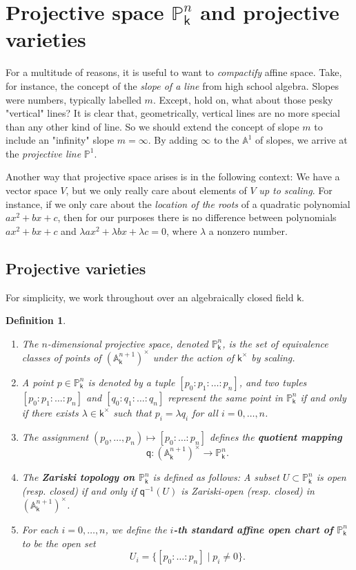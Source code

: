 \documentclass[11pt]{article}
\newcommand{\A}{\mathbb{A}}
\renewcommand{\P}{\mathbb{P}}
\newcommand{\q}{\mathsf{q}}
\renewcommand{\k}{\mathsf{k}}
\renewcommand{\to}{\longrightarrow}
\newcommand{\A}{\mathbb A}
\renewcommand{\k}{\mathsf{k}}
\renewcommand{\P}{\mathbb P}
\renewcommand{\to}{{\longrightarrow}}
\newtheorem{definition}{Definition}[section]
\begin{document}
\section{Projective space \(\P^n_{\k}\) and projective varieties}
\label{sec:org2d7dd4c}
For a multitude of reasons, it is useful to want to \emph{compactify} affine space.  Take, for instance, the concept of the \emph{slope of a line} from high school algebra.  Slopes were numbers, typically labelled \(m\).  Except, hold on, what about those pesky "vertical" lines?  It is clear that, geometrically, vertical lines are no more special than any other kind of line.  So we should extend the concept of slope \(m\) to include an "infinity" slope \(m =\infty\). By adding \(\infty\) to the \(\A^1\) of slopes, we arrive at the \emph{projective line} \(\P^1\).

Another way that projective space arises is in the following context:  We have a vector space \(V\), but we only really care  about elements of \(V\) \emph{up to scaling}.  For instance, if we only care about the \emph{location of the roots} of a quadratic polynomial \(ax^2+bx+c\), then for our purposes there is no difference between polynomials \(ax^2+bx+c\) and \(\lambda a x^2 + \lambda b x + \lambda c =0\), where \(\lambda\) a nonzero number.
\subsection{Projective varieties}
\label{sec:orgb151089}
For simplicity, we work throughout over an algebraically closed field \(\k\).

\begin{definition}
\begin{enumerate}
\item The \(n\)-dimensional projective space, denoted \(\P^n_{\k}\), is the set of equivalence classes of points of \(\left(\A^{n+1}_{\k}\right)^{\times}\) under the action of \(\k^{\times}\) by scaling.
\item A point \(p \in  \P^n_{\k}\) is denoted by a tuple \([p_0 : p_1 : \ldots : p_n]\), and two tuples \([p_0 : p_1 : \ldots : p_n]\) and \([q_0 : q_1 : \dots : q_n]\) represent the same point in \(\P^n_{\k}\) if and only if there exists \(\lambda \in \k^{\times}\) such that \(p_i = \lambda q_i\) for all \(i = 0,\ldots, n\).
\item The assignment \((p_0, \dots, p_n) \mapsto [p_0 : \dots : p_n]\) defines the \textbf{\emph{quotient mapping}} \[\q : \left( \A^{n+1}_{\k}\right)^{\times} \to \P^n_{\k}.\]
\item The \textbf{\emph{Zariski topology on \(\P^n_{\k}\)}} is defined as follows: A subset \(U \subset \P^n_{\k}\) is open (resp. closed) if and only if \(\q^{-1}(U)\) is Zariski-open (resp. closed) in  \(\left( \A^{n+1}_{\k}\right)^{\times}\).
\item For each \(i=0, \ldots, n\), we define the \textbf{\emph{\(i\)-th standard affine open chart of \(\P^n_{\k}\)}} to be the open set \[U_{i} = \big\{ [p_{0}: \ldots : p_n] \mid p_i \neq 0 \big\}.\]
\end{enumerate}
\end{definition}
\end{document}
